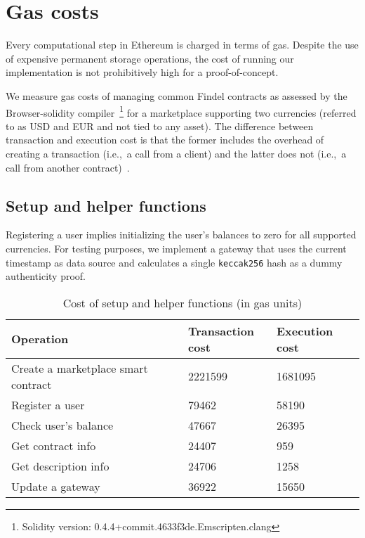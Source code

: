 
\section{Gas costs} \label{sec:Ch10_Findel_Testing}

Every computational step in Ethereum is charged in terms of gas.
Despite the use of expensive permanent storage operations, the cost of running our implementation is not prohibitively high for a proof-of-concept.

We measure gas costs of managing common Findel contracts as assessed by the Browser-solidity compiler~\cite{BrowserSolidity}\footnote{Solidity version: 0.4.4+commit.4633f3de.Emscripten.clang} for a marketplace supporting two currencies (referred to as USD and EUR and not tied to any asset).
The difference between transaction and execution cost is that the former includes the overhead of creating a transaction (i.e.,~a call from a client) and the latter does not (i.e.,~a call from another contract)~\cite{Revere2016}.

\subsection{Setup and helper functions}

Registering a user implies initializing the user's balances to zero for all supported currencies.
For testing purposes, we implement a gateway that uses the current timestamp as data source and calculates a single \texttt{keccak256} hash as a dummy authenticity proof.

\begin{table}
	\centering
	\begin{tabular}{| p{0.5\linewidth} | p{0.25\linewidth} | p{0.25\linewidth} |}
		\hline
		\textbf{Operation} & \textbf{Transaction cost} & \textbf{Execution cost} \\
		\hline
		Create a marketplace smart contract & 2221599 & 1681095 \\
		\hline
		Register a user & 79462 & 58190 \\
		\hline
		Check user's balance & 47667 & 26395 \\
		\hline
		Get contract info & 24407 & 959 \\
		\hline
		Get description info & 24706 & 1258 \\
		\hline
		Update a gateway & 36922 & 15650 \\
		\hline
	\end{tabular}
	\caption{Cost of setup and helper functions (in gas units)}
	\label{tab:Ch10_Findel_Cost}
\end{table}


